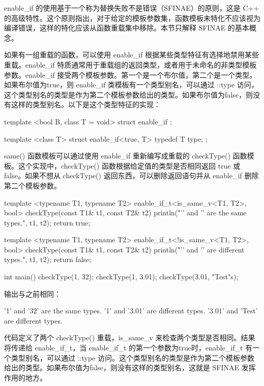 
enable\_if 的使用基于一个称为替换失败不是错误（SFINAE）的原则，这是 C++ 的高级特性。这个原则指出，对于给定的模板参数集，函数模板未特化不应该视为编译错误，这样的特化应该从函数重载集中移除。本节只解释 SFINAE 的基本概念。

如果有一组重载的函数，可以使用 enable\_if 根据某些类型特征有选择地禁用某些重载。enable\_if 特质通常用于重载组的返回类型，或者用于未命名的非类型模板参数。enable\_if 接受两个模板参数。第一个是一个布尔值，第二个是一个类型。如果布尔值为true，则 enable\_if 类模板有一个类型别名，可以通过 ::type 访问，这个类型别名的类型是作为第二个模板参数给出的类型。如果布尔值为false，则没有这样的类型别名。以下是这个类型特征的实现：

\begin{cpp}
template <bool B, class T = void>
struct enable_if {};

template <class T>
struct enable_if<true, T> { typedef T type; };
\end{cpp}

same() 函数模板可以通过使用 enable\_if 重新编写成重载的 checkType() 函数模板。这个实现中，checkType() 函数根据给定值的类型是否相同返回 true 或 false。如果不想从 checkType() 返回东西，可以删除返回语句并从 enable\_if 删除第二个模板参数。

\begin{cpp}
template <typename T1, typename T2>
enable_if_t<is_same_v<T1, T2>, bool>
checkType(const T1& t1, const T2& t2)
{
    println("'{}' and '{}' are the same types.", t1, t2);
    return true;
}

template <typename T1, typename T2>
enable_if_t<!is_same_v<T1, T2>, bool>
checkType(const T1& t1, const T2& t2)
{
    println("'{}' and '{}' are different types.", t1, t2);
    return false;
}

int main()
{
    checkType(1, 32);
    checkType(1, 3.01);
    checkType(3.01, "Test"s);
}
\end{cpp}

输出与之前相同：

\begin{shell}
'1' and '32' are the same types.
'1' and '3.01' are different types.
'3.01' and 'Test' are different types.
\end{shell}

代码定义了两个 checkType() 重载，is\_same\_v 来检查两个类型是否相同。结果将传递给 enable\_if\_t，当 enable\_if\_t 的第一个参数为true时，enable\_if\_t 有一个类型别名，可以通过 ::type 访问。这个类型别名的类型是作为第二个模板参数给出的类型。如果布尔值为false，则没有这样的类型别名，这就是 SFINAE 发挥作用的地方。

